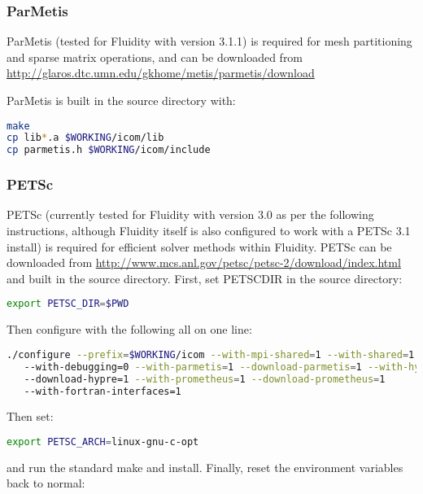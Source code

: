 \subsubsection{ParMetis}
\label{sec:required_libraries_numerical_parmetis}

ParMetis (tested for Fluidity with version 3.1.1) is required for mesh
partitioning and sparse matrix operations, and can be downloaded from
\url{http://glaros.dtc.umn.edu/gkhome/metis/parmetis/download}

ParMetis is built in the source directory with:

\begin{lstlisting}[language=bash]
make
cp lib*.a $WORKING/icom/lib
cp parmetis.h $WORKING/icom/include
\end{lstlisting}

\subsubsection{PETSc}
\label{sec:required_libraries_numerical_petsc}

PETSc (currently tested for Fluidity with version 3.0 as per the following
instructions, although Fluidity itself is also configured to work with a PETSc
3.1 install) is required for efficient solver methods within Fluidity. PETSc
can be downloaded from
\url{http://www.mcs.anl.gov/petsc/petsc-2/download/index.html} and built in the
source directory. First, set PETSC{\textunderscore}DIR in the source directory:

\begin{lstlisting}[language=bash]
export PETSC_DIR=$PWD
\end{lstlisting}

Then configure with the following all on one line:

\begin{lstlisting}[language=bash]
./configure --prefix=$WORKING/icom --with-mpi-shared=1 --with-shared=1
   --with-debugging=0 --with-parmetis=1 --download-parmetis=1 --with-hypre=1
   --download-hypre=1 --with-prometheus=1 --download-prometheus=1
   --with-fortran-interfaces=1
\end{lstlisting}

Then set:

\begin{lstlisting}[language=bash]
export PETSC_ARCH=linux-gnu-c-opt
\end{lstlisting}

and run the standard make and install. Finally, reset the environment variables
back to normal:

